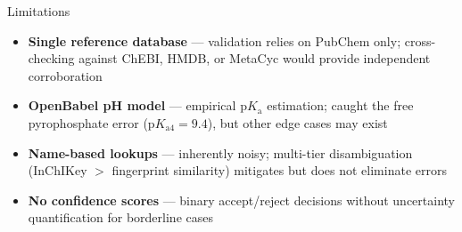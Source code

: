 \documentclass[aspectratio=169,11pt]{beamer}
\begin{document}
\begin{frame}{Limitations}

\begin{itemize}\setlength\itemsep{6pt}
  \item \textbf{Single reference database} --- validation relies on
        PubChem only; cross-checking against ChEBI, HMDB, or MetaCyc
        would provide independent corroboration
  \item \textbf{OpenBabel pH model} --- empirical $\text{p}K_\text{a}$
        estimation; caught the free pyrophosphate error
        ($\text{p}K_{\text{a}4}{=}9.4$), but other edge cases may exist
  \item \textbf{Name-based lookups} --- inherently noisy; multi-tier
        disambiguation (InChIKey $>$ fingerprint similarity) mitigates
        but does not eliminate errors
  \item \textbf{No confidence scores} --- binary accept/reject
        decisions without uncertainty quantification for borderline
        cases
\end{itemize}

\end{frame}
\end{document}
